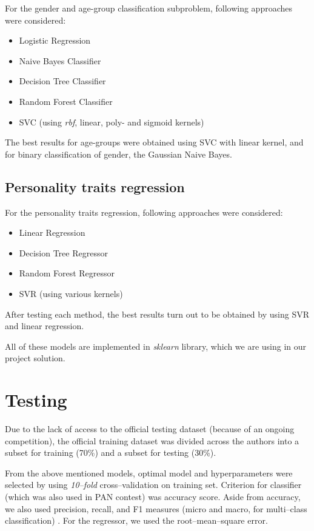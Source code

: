 \documentclass[10pt, a4paper]{article}
\begin{document}
For the gender and age-group classification subproblem, following approaches were considered:
\begin{itemize}
	\item Logistic Regression
	\item Naive Bayes Classifier
	\item Decision Tree Classifier
	\item Random Forest Classifier
	\item SVC (using \textit{rbf}, linear, poly- and sigmoid kernels)
\end{itemize}
\noindent The best results for age-groups were obtained using SVC with linear kernel, and for binary classification of gender, the Gaussian Naive Bayes.

\subsection{Personality traits regression}
For the personality traits regression, following approaches were considered:
\begin{itemize}
	\item Linear Regression
	\item Decision Tree Regressor
	\item Random Forest Regressor
	\item SVR (using various kernels)
\end{itemize}
\noindent After testing each method, the best results turn out to be obtained by using SVR and linear regression.

All of these models are implemented in \textit{sklearn} library, which we are using in our project solution.

\section{Testing}
Due to the lack of access to the official testing dataset (because of an ongoing competition), the official training dataset was divided across the authors into a subset for training (70\%) and a subset for testing (30\%). 

From the above mentioned models, optimal model and hyperparameters were selected by using \textit{10--fold} cross--validation on training set.
Criterion for classifier (which was also used in PAN contest\citep{panoverview}) was accuracy score.
Aside from accuracy, we also used precision, recall, and F1 measures (micro and macro, for multi--class classification) \citep{panoverviewl}.
For the regressor, we used the root--mean--square error.
\end{document}

